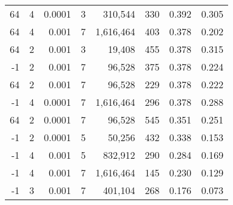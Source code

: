 \begin{tabular}{rrrrrrrr}
64 & 4 & 0.0001 & 3 & 310,544 & 330 & 0.392 & 0.305 \\
64 & 4 & 0.001 & 7 & 1,616,464 & 403 & 0.378 & 0.202 \\
64 & 2 & 0.001 & 3 & 19,408 & 455 & 0.378 & 0.315 \\
-1 & 2 & 0.001 & 7 & 96,528 & 375 & 0.378 & 0.224 \\
64 & 2 & 0.001 & 7 & 96,528 & 229 & 0.378 & 0.222 \\
-1 & 4 & 0.0001 & 7 & 1,616,464 & 296 & 0.378 & 0.288 \\
64 & 2 & 0.0001 & 7 & 96,528 & 545 & 0.351 & 0.251 \\
-1 & 2 & 0.0001 & 5 & 50,256 & 432 & 0.338 & 0.153 \\
-1 & 4 & 0.001 & 5 & 832,912 & 290 & 0.284 & 0.169 \\
-1 & 4 & 0.001 & 7 & 1,616,464 & 145 & 0.230 & 0.129 \\
-1 & 3 & 0.001 & 7 & 401,104 & 268 & 0.176 & 0.073 \\
\bottomrule
\end{tabular}
